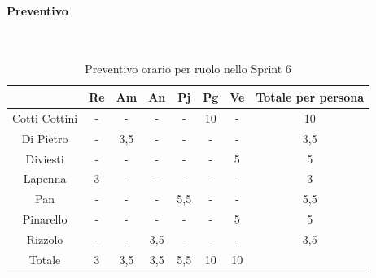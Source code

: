 \documentclass{article}
\begin{document}
                \paragraph{Preventivo}\mbox{}\\
                \begin{table}[H]
                    \centering
                    \begin{tabular}{|c|c|c|c|c|c|c|c|}
                    \hline
                                  & Re  & Am  & An  & Pj  & Pg  & Ve  & Totale per persona \\ \hline
                    Cotti Cottini & -   & -   & -   & -   & 10  & -   & 10                 \\ \hline
                    Di Pietro     & -   & 3,5 & -   & -   & -   & -   & 3,5                \\ \hline
                    Diviesti      & -   & -   & -   & -   & -   & 5   & 5                  \\ \hline
                    Lapenna       & 3   & -   & -   & -   & -   & -   & 3                  \\ \hline
                    Pan           & -   & -   & -   & 5,5 & -   & -   & 5,5                \\ \hline
                    Pinarello     & -   & -   & -   & -   & -   & 5   & 5                  \\ \hline
                    Rizzolo       & -   & -   & 3,5 & -   & -   & -   & 3,5                \\ \hline
                    Totale        & 3   & 3,5 & 3,5 & 5,5 & 10  & 10  &                    \\ \hline
                    \end{tabular}
                    \caption{Preventivo orario per ruolo nello Sprint 6}
                \end{table}

\end{document}

